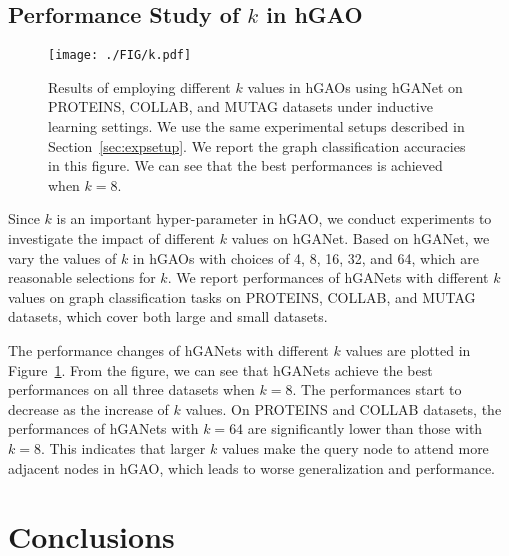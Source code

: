 \documentclass[sigconf]{acmart}
\begin{document}
\subsection{Performance Study of $k$ in hGAO}

\begin{figure}[t] \texttt{[image: ./FIG/k.pdf]}
\caption{ Results of employing different $k$ values in hGAOs using hGANet on
PROTEINS, COLLAB, and MUTAG datasets under inductive learning settings.
We use the same experimental setups
described in Section~\ref{sec:expsetup}. We report the graph classification
accuracies in this figure. We can see that the best performances is achieved
when $k=8$.}\label{fig:k_exp}
\end{figure}

Since $k$ is an important hyper-parameter in hGAO, we conduct experiments to
investigate the impact of different $k$ values on hGANet. Based on hGANet, we
vary the values of $k$ in hGAOs with choices of 4, 8, 16, 32, and 64, which
are reasonable selections for $k$. We report performances of hGANets with
different $k$ values on graph classification tasks on PROTEINS, COLLAB, and
MUTAG datasets, which cover both large and small datasets.


The performance changes of hGANets with different $k$ values are plotted in
Figure~\ref{fig:k_exp}. From the figure, we can see that hGANets achieve the
best performances on all three datasets when $k=8$. The performances start to
decrease as the increase of $k$ values. On PROTEINS and COLLAB datasets, the
performances of hGANets with $k=64$ are significantly lower than those with
$k=8$. This indicates that larger $k$ values make the query node to attend
more adjacent nodes in hGAO, which leads to worse generalization and
performance.



\section{Conclusions}
\end{document}
